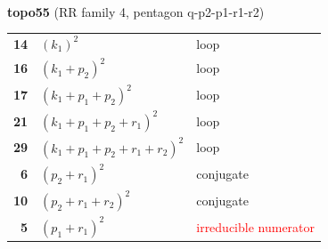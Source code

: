 \documentclass[10pt]{article}
\begin{document}
\begin{minipage}[t]{0.48\textwidth}
{}\\[2mm]\textbf{topo55} (RR family 4, pentagon q-p2-p1-r1-r2)\\[2pt]{\footnotesize\begin{tabular}{@{}r@{\ \ }l@{\ \ }l@{}}\textbf{14} & $(k_1)^2$ & loop\\
\textbf{16} & $(k_1+p_2)^2$ & loop\\
\textbf{17} & $(k_1+p_1+p_2)^2$ & loop\\
\textbf{21} & $(k_1+p_1+p_2+r_1)^2$ & loop\\
\textbf{29} & $(k_1+p_1+p_2+r_1+r_2)^2$ & loop\\
\textbf{6} & $(p_2+r_1)^2$ & conjugate\\
\textbf{10} & $(p_2+r_1+r_2)^2$ & conjugate\\
\textbf{5} & $(p_1+r_1)^2$ & \textcolor{red}{irreducible numerator}\\\end{tabular}}\end{minipage}\hfill%
\end{document}
